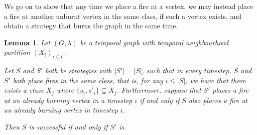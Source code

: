 \documentclass[preprint,12pt]{elsarticle}
\newtheorem{lemma}{Lemma}
\begin{document}
We go on to show that any time we place a fire at a vertex, we may instead place a fire at another unburnt vertex in the same class, if such a vertex exists, and obtain a strategy that burns the graph in the same time.

\begin{lemma}
    \label{lem:anyfromclass1}
    Let $(G, \lambda)$ be a temporal graph with temporal neighbourhood partition $(X_i)_{i\in I}$.

    Let $S$ and $S'$ both be strategies with $|S'| = |S|$, such that in every timestep, $S$ and $S'$ both place fires in the same class, that is, for any $i \leq |S|$, we have that there exists a class $X_j$ where $\{ s_i, s'_i \} \subseteq  X_j$. Furthermore, suppose that $S'$ places a fire at an already burning vertex in a timestep $i$ if and only if $S$ also places a fire at an already burning vertex in timestep $i$.

    Then $S$ is successful if and only if $S'$ is.
\end{lemma}
\end{document}

